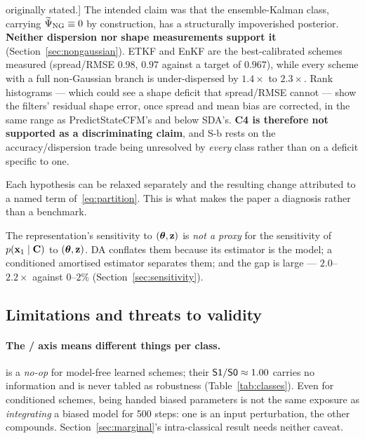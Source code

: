 \begin{description}[leftmargin=2.2em,style=nextline]
{{    originally stated}.}]
    The intended claim was that the ensemble-Kalman class, carrying
    $\widetilde{\Psi}_{\mathrm{NG}} \equiv 0$ by construction, has a structurally impoverished posterior.
    \textbf{Neither dispersion nor shape measurements support it}
    (Section~\ref{sec:nongaussian}). ETKF and EnKF are the best-calibrated
    schemes measured (spread/RMSE $0.98$, $0.97$ against a target of $0.967$),
    while every scheme with a full non-Gaussian branch is under-dispersed by
    $1.4\times$ to $2.3\times$. Rank histograms --- which could see a shape
    deficit that spread/RMSE cannot --- show the filters' residual shape error,
    once spread and mean bias are corrected, in the same range as
    PredictStateCFM's and below SDA's. \textbf{C4 is therefore not supported as a
    discriminating claim}, and S-b rests on the accuracy/dispersion trade being
    unresolved by \emph{every} class rather than on a deficit specific to one.
  \item[\textbf{C5 (attribution).}]
    Each hypothesis can be relaxed separately and the resulting change
    attributed to a named term of~\eqref{eq:partition}. This is what makes the
    paper a diagnosis rather than a benchmark.
  \item[\textbf{C6 (H2 $\times$ H3b).}]
    The representation's sensitivity to $(\boldsymbol{\theta},\mathbf{z})$ is \emph{not a proxy} for
    the sensitivity of $p(\mathbf{x}_1\mid\mathbf{C})$ to $(\boldsymbol{\theta},\mathbf{z})$. DA conflates them
    because its estimator is the model; a conditioned amortised estimator
    separates them; and the gap is large --- $2.0$--$2.2\times$ against $0$--$2\%$
    (Section~\ref{sec:sensitivity}).
\end{description}

\subsection{Limitations and threats to validity}
\label{sec:limitations}

\paragraph{The \Sz{}/\So{} axis means different things per class.}
\So{} is a \emph{no-op} for model-free learned schemes; their $\textsf{S1}/\textsf{S0}\approx 1.00$
carries no information and is never tabled as robustness
(Table~\ref{tab:classes}). Even for conditioned schemes, being handed biased
parameters is not the same exposure as \emph{integrating} a biased model for 500
steps: one is an input perturbation, the other compounds. Section~\ref{sec:marginal}'s
intra-classical result needs neither caveat.

